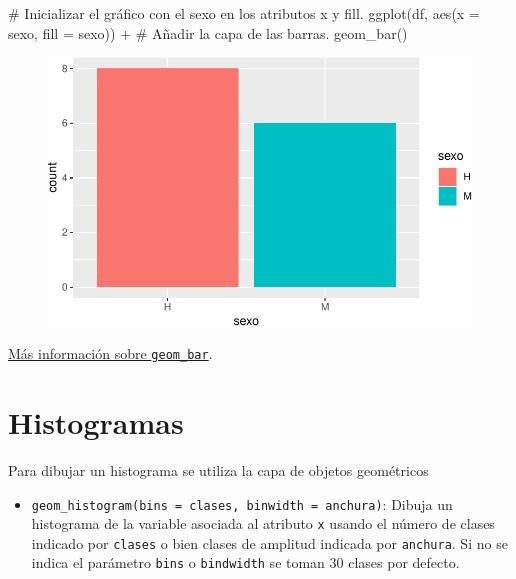 \documentclass[
  a4paper,
]{scrreport}
\newenvironment{Shaded}{\begin{snugshade}}{\end{snugshade}}
\newcommand{\AttributeTok}[1]{\textcolor[rgb]{0.40,0.45,0.13}{#1}}
\newcommand{\CommentTok}[1]{\textcolor[rgb]{0.37,0.37,0.37}{#1}}
\newcommand{\FunctionTok}[1]{\textcolor[rgb]{0.28,0.35,0.67}{#1}}
\newcommand{\NormalTok}[1]{\textcolor[rgb]{0.00,0.23,0.31}{#1}}
\newcommand{\SpecialCharTok}[1]{\textcolor[rgb]{0.37,0.37,0.37}{#1}}
\providecommand{\tightlist}{%
  \setlength{\itemsep}{0pt}\setlength{\parskip}{0pt}}\usepackage{longtable,booktabs,array}
\theoremstyle{definition}
\theoremstyle{definition}
\theoremstyle{remark}
\begin{document}
\begin{Shaded}
\begin{Highlighting}[]
\CommentTok{\# Inicializar el gráfico con el sexo en los atributos x y fill.}
\FunctionTok{ggplot}\NormalTok{(df, }\FunctionTok{aes}\NormalTok{(}\AttributeTok{x =}\NormalTok{ sexo, }\AttributeTok{fill =}\NormalTok{ sexo)) }\SpecialCharTok{+}
\CommentTok{\# Añadir la capa de las barras.}
    \FunctionTok{geom\_bar}\NormalTok{() }
\end{Highlighting}
\end{Shaded}

\begin{figure}[H]

{\centering \includegraphics{07-graficos_files/figure-pdf/unnamed-chunk-14-1.pdf}

}

\end{figure}

\href{https://ggplot2.tidyverse.org/reference/geom_bar.html}{Más
información sobre \texttt{geom\_bar}}.

\hypertarget{histogramas}{%
\section{Histogramas}\label{histogramas}}

Para dibujar un histograma se utiliza la capa de objetos geométricos

\begin{itemize}
\tightlist
\item
  \texttt{geom\_histogram(bins\ =\ clases,\ binwidth\ =\ anchura)}:
  Dibuja un histograma de la variable asociada al atributo \texttt{x}
  usando el número de clases indicado por \texttt{clases} o bien clases
  de amplitud indicada por \texttt{anchura}. Si no se indica el
  parámetro \texttt{bins} o \texttt{bindwidth} se toman 30 clases por
  defecto.
\end{itemize}
\end{document}
